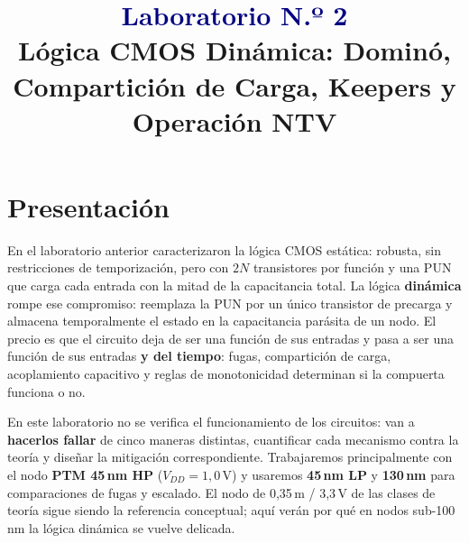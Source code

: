\documentclass[11pt,a4paper]{article}
\title{\vspace{-1.2cm}\textcolor{navy}{\textbf{Laboratorio N.º 2}}\\[3pt]
\large Lógica CMOS Dinámica: Dominó, Compartición de Carga, Keepers y Operación NTV}
\begin{document}
\maketitle
\thispagestyle{fancy}

\section{Presentación}
En el laboratorio anterior caracterizaron la lógica CMOS estática: robusta, sin restricciones de temporización, pero con $2N$ transistores por función y una PUN que carga cada entrada con la mitad de la capacitancia total. La lógica \textbf{dinámica} rompe ese compromiso: reemplaza la PUN por un único transistor de precarga y almacena temporalmente el estado en la capacitancia parásita de un nodo. El precio es que el circuito deja de ser una función de sus entradas y pasa a ser una función de sus entradas \textbf{y del tiempo}: fugas, compartición de carga, acoplamiento capacitivo y reglas de monotonicidad determinan si la compuerta funciona o no.

En este laboratorio no se verifica el funcionamiento de los circuitos: van a \textbf{hacerlos fallar} de cinco maneras distintas, cuantificar cada mecanismo contra la teoría y diseñar la mitigación correspondiente. Trabajaremos principalmente con el nodo \textbf{PTM 45\,nm HP} ($V_{DD}=1{,}0$\,V) y usaremos \textbf{45\,nm LP} y \textbf{130\,nm} para comparaciones de fugas y escalado. El nodo de 0{,}35\,\textmu m / 3{,}3\,V de las clases de teoría sigue siendo la referencia conceptual; aquí verán por qué en nodos sub-100\,nm la lógica dinámica se vuelve delicada.
\end{document}
